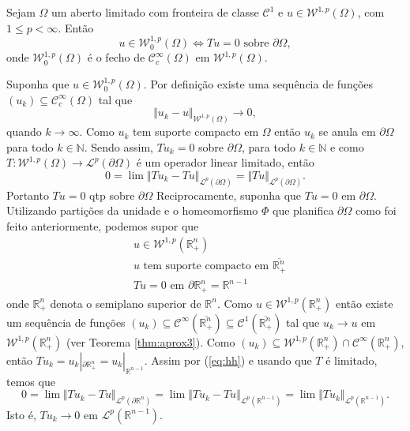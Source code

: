 \documentclass[a4paper, 11pt]{book}
\theoremstyle{definition}
\newcommand{\bN}{\mathbb{N}}
\newcommand{\bR}{\mathbb{R}}
\newcommand{\cC}{\mathcal{C}}
\newcommand{\cL}{\mathcal{L}}
\newcommand{\cW}{\mathcal{W}}
\begin{document}
\begin{tbox}[Funções traço zero em $\cW^{1,p}$]
    Sejam $\Omega$ um aberto limitado com fronteira de classe $\cC^1$ e $u \in \cW^{1,p}(\Omega)$, com $1 \leqslant p < \infty$. Então
    \[
        u \in \cW_0^{1,p}(\Omega) \iff Tu = 0 \text{ sobre } \partial \Omega,
    \]
    onde $\cW_0^{1,p}(\Omega)$ é o fecho de $\cC^{\infty}_c(\Omega)$ em $\cW^{1,p}(\Omega)$.
\end{tbox}
\begin{prf}
    Suponha que $u \in \cW_0^{1,p}(\Omega)$. Por definição existe uma sequência de funções $(u_k) \subseteq \cC^{\infty}_c(\Omega)$ tal que
    \[
        \Vert u_k - u \Vert_{\cW^{1,p}(\Omega)} \to 0,
    \]
    quando $k \to \infty$. Como $u_k$ tem suporte compacto em $\Omega$ então $u_k$ se anula em $\partial \Omega$ para todo $k \in \bN$. Sendo assim, $Tu_k = 0$ sobre $\partial\Omega$, para todo $k \in \bN$ e como $T : \cW^{1,p}(\Omega) \to \cL^p(\partial \Omega)$ é um operador linear limitado, então
    \[
        0 = \lim \Vert Tu_k - Tu \Vert_{\cL^p(\partial \Omega)} = \Vert Tu \Vert_{\cL^p(\partial \Omega)}.
    \]
    Portanto $Tu =0$ qtp sobre $\partial \Omega$
    Reciprocamente, suponha que $Tu = 0$ em $\partial \Omega$. Utilizando partições da unidade e o homeomorfismo $\Phi$ que planifica $\partial \Omega$ como foi feito anteriormente, podemos supor que
    \begin{equation} \label{eq:hh}
        \begin{aligned}
            &u \in \cW^{1,p}(\bR^n_+)\\
            &u \text{ tem suporte compacto em } \overline{\bR^n_+}\\
            &Tu = 0 \text{ em } \partial \bR^n_+ = \bR^{n-1}
        \end{aligned}
    \end{equation}
    onde $\bR^n_+$ denota o semiplano superior de $\bR^n$.
    Como $u \in \cW^{1,p}(\bR^n_+)$ então existe um sequência de funções $(u_k) \subseteq \cC^{\infty}(\overline{\bR^n_+}) \subseteq \cC^1(\overline{\bR^n_+})$ tal que $u_k \to u$ em $\cW^{1,p}(\bR^n_+)$ (ver Teorema \ref{thm:aprox3}). Como $(u_k) \subseteq \cW^{1,p}(\bR^n_+) \cap \cC^\infty(\bR^n_+)$, então $T u_k = u_k |_{\partial \bR^n_+} = u_k |_{\bR^{n-1}}$.
    Assim por (\ref{eq:hh}) e usando que $T$ é limitado, temos que
    \[
        0 = \lim \Vert Tu_k - Tu \Vert_{\cL^p(\partial \bR^n)} = \lim \Vert Tu_k - Tu \Vert_{\cL^p(\bR^{n-1})} = \lim \Vert Tu_k \Vert_{\cL^p(\bR^{n-1})}.
    \]
    Isto é, $T u_k \to 0$ em $\cL^p(\bR^{n-1})$.


\end{prf}
\end{document}
